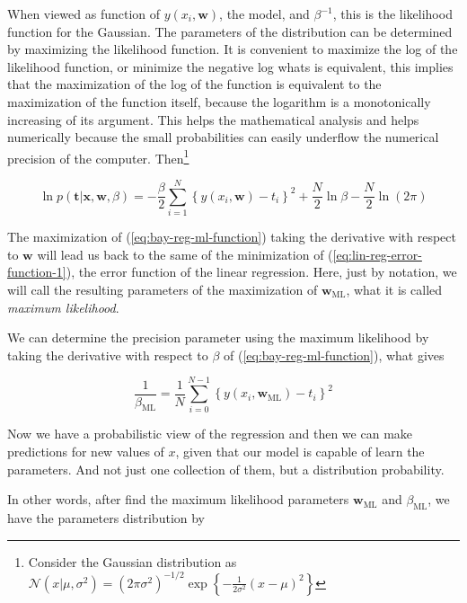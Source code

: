 \documentclass[11pt]{article} %
\begin{document}
When viewed as function of $y(x_i, \mathbf{w})$, the model, and $\beta^{-1}$, this is the likelihood function for the Gaussian. The parameters of the distribution can be determined by maximizing the likelihood function. It is convenient to maximize the log of the likelihood function, or minimize the negative log whats is equivalent, this implies that the maximization of the log of the function is equivalent to the maximization of the function itself, because the logarithm is a monotonically increasing of its argument. This helps the mathematical analysis and helps numerically because the small probabilities can easily underflow the numerical precision of the computer. Then\footnote[2]{Consider the Gaussian distribution as $\mathcal{N}\left(x | \mu, \sigma^{2}\right)=\left(2 \pi \sigma^{2}\right)^{-1 / 2} \exp \left\{-\frac{1}{2 \sigma^{2}}(x-\mu)^{2}\right\}$}

\begin{equation}
   \label{eq:bay-reg-ml-function}
   \ln p(\mathbf{t} | \mathbf{x}, \mathbf{w}, \beta)=-\frac{\beta}{2} \sum_{i=1}^{N}\left\{y\left(x_{i}, \mathbf{w}\right)-t_{i}\right\}^{2}+\frac{N}{2} \ln \beta-\frac{N}{2} \ln (2 \pi)
\end{equation}

The maximization of (\ref{eq:bay-reg-ml-function}) taking the derivative with respect to $\mathbf{w}$ will lead us back to 
the same of the minimization of (\ref{eq:lin-reg-error-function-1}), the error function of the linear regression. Here, just by notation, we will call the resulting parameters of the maximization of $\mathbf{w}_{\text{ML}}$, what it is called \textit{maximum likelihood}.

We can determine the precision parameter using the maximum likelihood by taking the derivative with respect to $\beta$ of (\ref{eq:bay-reg-ml-function}), what gives

\begin{equation}
   \frac{1}{\beta_{\mathrm{ML}}}=\frac{1}{N} \sum_{i=0}^{N-1}\left\{y\left(x_{i}, \mathbf{w}_{\mathrm{ML}}\right)-t_{i}\right\}^{2}
\end{equation}

Now we have a probabilistic view of the regression and then we can make predictions for new values of $x$, given that our model is capable of learn the parameters. And not just one collection of them, but a distribution probability.

In other words, after find the maximum likelihood parameters $\mathbf{w}_\text{ML}$ and $\beta_\text{ML}$, we have the parameters distribution by
\end{document}
